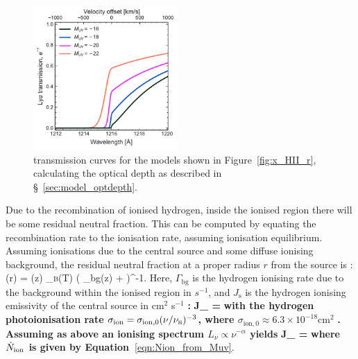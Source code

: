 \documentclass[fleqn,usenatbib]{mnras}
\providecommand{\DIFadd}[1]{{\protect\color{Green} \bf #1}} %
\providecommand{\DIFaddbegin}{} %
\providecommand{\DIFaddend}{} %
\newcommand{\DIFaddincludegraphics}[2][]{{\color{blue}\fbox{\DIFOincludegraphics[#1]{#2}}}} %
\DeclareRobustCommand{\DIFaddbegin}{\DIFOaddbegin \let\includegraphics\DIFaddincludegraphics} %
\DeclareRobustCommand{\DIFaddend}{\DIFOaddend \let\includegraphics\DIFOincludegraphics} %
\begin{document}
\begin{figure}
    \includegraphics[width=0.49\textwidth]{figs/fig3.pdf}
    \caption{\lya transmission curves for the models shown in Figure~\ref{fig:x_HII_r}, calculating the optical depth as described in \S~\ref{sec:model_optdepth}.}
    \label{fig:transmission_Muv}
\end{figure}
Due to the recombination of ionised hydrogen, inside the ionised region there will be some residual neutral fraction. This can be computed by equating the recombination rate to the ionisation rate, assuming ionisation equilibrium. Assuming ionisations due to the central source and some diffuse ionising background, the residual neutral fraction at a proper radius $r$ from the source is \citep[e.g.,][]{Mesinger2004}:
%
\BE \label{eqn:HII_xHI}
\xHI(r) = \clump \DIFaddbegin \DIFadd{\Delta }\DIFaddend \nh(z) \alpha_\textsc{b}(T) \left( \Gamma_\textrm{bg}(z) +  \right)^{-1}.
\EE
%
Here, $\Gamma_\textrm{bg}$ is the hydrogen ionising rate due to the background within the ionised region in $s^{-1}$, and $J_\mathrm{s}$ is the hydrogen ionising emissivity of the central source in cm$^2$ s$^{-1}$\DIFaddbegin \DIFadd{:
}\BE \label{eqn:HII_gammasource}
\DIFadd{J_ = }\fesc \DIFadd{\int_{\nu_\textsc{h}}^\infty \,}\dd\DIFadd{\nu \, \frac{L_\nu}{h\nu} \sigma_\mathrm{ion}(\nu)
}\EE
\DIFadd{with the hydrogen photoionisation rate $\sigma_\mathrm{ion} = \sigma_{\mathrm{ion},0} (\nu/\nu_\textsc{h})^{-3}$, where $\sigma_{\mathrm{ion},0} \approx 6.3\times10^{-18}\textrm{cm}^2$ }\citep[e.g.,][]{Draine2011}\DIFadd{. Assuming as above an ionising spectrum $L_\nu \propto \nu^{-\alpha}$ yields
}\BE \label{eqn:HII_gammasource_Nion}
\DIFadd{J_ = }\fesc  \Nion \DIFadd{\frac{\alpha}{\alpha + 3} \sigma_{\mathrm{ion},0}
}\EE
\DIFadd{where $\Nion$ is given by Equation~}\eqref{eqn:Nion_from_Muv}\DIFaddend . 
\DIFaddbegin 
\end{document}

